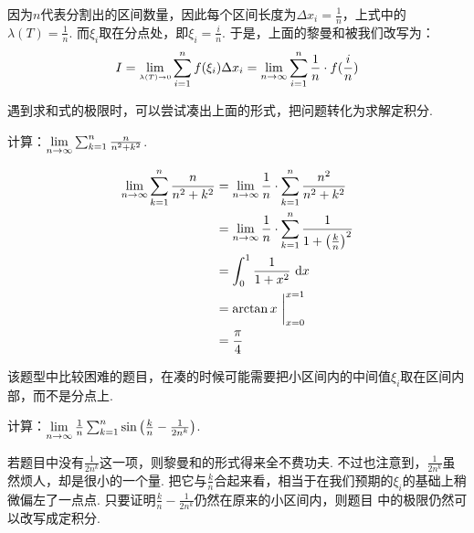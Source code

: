 因为$n$代表分割出的区间数量，因此每个区间长度为$\Delta x_{i}=\frac{1}{n}$，上式中的$\lambda(T)=\frac{1}{n}$.
而$\xi_{i}$取在分点处，即$\xi_{i}=\frac{i}{n}$. 于是，上面的黎曼和被我们改写为：
$$
\setlength\abovedisplayskip{10pt}
\setlength\belowdisplayskip{10pt}
I = \lim\limits_{\scriptscriptstyle\lambda(T)\to 0}\sum_{i=1}^{n}f(\xi_{i})\Delta x_{i}
= \limn \sum_{i=1}^{n} \frac{1}{n}\cdot  f(\frac{i}{n})
$$\par
遇到求和式的极限时，可以尝试凑出上面的形式，把问题转化为求解定积分.

\begin{example}
\label{ex:ch02-16}
计算：$\lim\limits_{n \to \infty} \sum_{k=1}^{n}\frac{n}{n^2+k^2}$.
\end{example}

\begin{solution}
\begin{equation}
    \begin{aligned}
        \lim\limits_{n \to \infty} \sum_{k=1}^{n}\frac{n}{n^2+k^2}
        &= \lim\limits_{n \to \infty} \frac{1}{n}\cdot \sum_{k=1}^{n} \frac{n^2}{n^2+k^2} \\
        &= \lim\limits_{n \to \infty} \frac{1}{n}\cdot \sum_{k=1}^{n} \frac{1}{1+\left(\frac{k}{n} \right)^2}\\
        &= \int_{0}^{1} \frac{1}{1+x^2} ~\mathrm{d} x \\
        &= \arctan x ~\bigg|_{x=0}^{x=1} \\
        &= \frac{\pi}{4}
        \nonumber
    \end{aligned}
\end{equation}
\end{solution}

该题型中比较困难的题目，在凑的时候可能需要把小区间内的中间值$\xi_{i}$取在区间内部，而不是分点上.

\begin{example}
\label{ex:ch02-17}
计算：$\lim\limits_{n \to \infty} \frac{1}{n} \sum_{k=1}^{n} \sin \left( \frac{k}{n} - \frac{1}{2n^k} \right)$.
\end{example}

\begin{analysis}
若题目中没有$\frac{1}{2n^k}$这一项，则黎曼和的形式得来全不费功夫. 不过也注意到，$\frac{1}{2n^k}$虽然烦人，却是很小的一个量.
把它与$\frac{k}{n} $合起来看，相当于在我们预期的$\xi_{i}$的基础上稍微偏左了一点点. 只要证明$\frac{k}{n} - \frac{1}{2n^k}$仍然在原来的小区间内，则题目
中的极限仍然可以改写成定积分.
\end{analysis}

